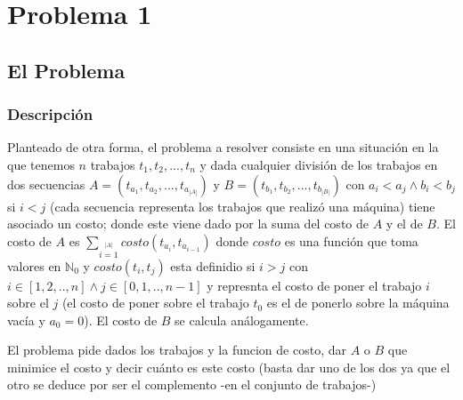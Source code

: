 \documentclass[A4paper,oneside,fleqn,11pt]{article}
\theoremstyle{definition}
\newcommand{\NN}{\mathbb{N}}
\begin{document}
 



\tableofcontents
\clearpage

\section{Problema 1}
\subsection{El Problema}

\subsubsection{Descripción}
Planteado de otra forma, el problema a resolver consiste en una situación en la que tenemos $n$ trabajos $t_{1},t_{2},...,t_{n}$ y dada cualquier división de los trabajos en dos secuencias $A=(t_{a_{1}},t_{a_{2}},..., t_{a_{|A|}})$ y $B=(t_{b_{1}}, t_{b_{2}},...,t_{b_{|B|}})$  con $a_{i}<a_{j} \land b_{i}<b_{j}$ si $i<j$ (cada secuencia representa los trabajos que realizó una máquina) tiene asociado un costo; donde este viene dado por la suma del costo de $A$ y el de $B$. El costo de $A$ es  $\sum\limits_{i=1}\limits^{|A|} costo (t_{a_{i}},t_{a_{i-1}})$  donde $costo$ es una función que toma valores en $\NN_{0}$ y $costo(t_{i},t_{j})$ esta definidio si $i>j$ con $i \in [1,2,..,n] \land j \in [0,1,..,n-1]$ y represnta el costo de poner el trabajo $i$ sobre el $j$ (el costo de poner sobre el trabajo $t_{0}$ es el de ponerlo sobre la máquina vacía y $a_{0}=0$). El costo de $B$ se calcula análogamente. 

El problema pide dados los trabajos y la funcion de costo, dar $A$ o $B$ que minimice el costo y decir cuánto es este costo (basta dar uno de los dos ya que el otro se deduce por ser el complemento -en el conjunto de trabajos-)
\end{document}
